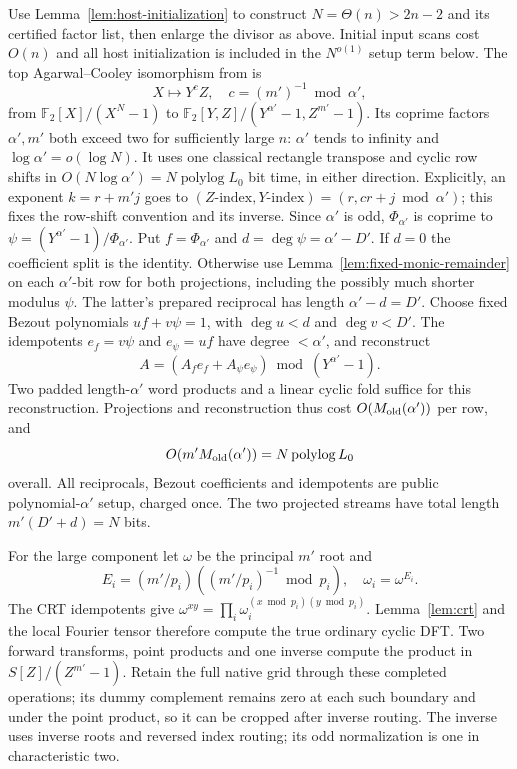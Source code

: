 \documentclass[11pt]{article}
\newcommand{\F}{\mathbb F}
\newcommand{\polylog}{\operatorname{polylog}}
\begin{document}
Use Lemma~\ref{lem:host-initialization} to construct
$N=\Theta(n)>2n-2$ and its certified factor list, then enlarge the
divisor as above. Initial input scans cost $O(n)$ and all host
initialization is included in the $N^{o(1)}$ setup term below.
The top Agarwal--Cooley isomorphism from \cite[Lemma 2.2]{cyclomult} is
\[
 X\longmapsto Y^cZ,\quad c=(m')^{-1}\bmod\alpha',
\]
from $\F_2[X]/(X^N-1)$ to
$\F_2[Y,Z]/(Y^{\alpha'}-1,Z^{m'}-1)$.
Its coprime factors $\alpha',m'$ both exceed two for sufficiently large
$n$: $\alpha'$ tends to infinity and $\log\alpha'=o(\log N)$.
It uses one classical rectangle transpose and cyclic row shifts in
$O(N\log\alpha')=N\polylog L_0$ bit time, in either direction.
Explicitly, an exponent $k=r+m'j$ goes to
$(Z\text{-index},Y\text{-index})=(r,cr+j\bmod\alpha')$;
this fixes the row-shift convention and its inverse.
Since $\alpha'$ is odd, $\Phi_{\alpha'}$ is coprime to
$\psi=(Y^{\alpha'}-1)/\Phi_{\alpha'}$.
Put $f=\Phi_{\alpha'}$ and $d=\deg\psi=\alpha'-D'$.
If $d=0$ the coefficient split is the identity. Otherwise use
Lemma~\ref{lem:fixed-monic-remainder} on each $\alpha'$-bit row
for both projections, including the possibly much shorter modulus
$\psi$. The latter's prepared reciprocal has length $\alpha'-d=D'$.
Choose fixed Bezout polynomials $uf+v\psi=1$, with
$\deg u<d$ and $\deg v<D'$. The idempotents
$e_f=v\psi$ and $e_\psi=uf$ have degree $<\alpha'$, and reconstruct
\[
 A=(A_f e_f+A_\psi e_\psi)\bmod(Y^{\alpha'}-1).
\]
Two padded length-$\alpha'$ word products and a linear cyclic fold
suffice for this reconstruction. Projections and reconstruction thus
  cost $O(M_{\rm old}(\alpha'))$ per row, and
  \[
    O(m'M_{\rm old}(\alpha'))=N\polylog L_0
  \]
  overall. All reciprocals,
Bezout coefficients and idempotents are public polynomial-$\alpha'$
setup, charged once. The two projected streams have total length
$m'(D'+d)=N$ bits.

For the large component let $\omega$ be the principal $m'$ root and
\[
 E_i=(m'/p_i)((m'/p_i)^{-1}\bmod p_i),\quad \omega_i=\omega^{E_i}.
\]
The CRT idempotents give
$\omega^{xy}=\prod_i\omega_i^{(x\bmod p_i)(y\bmod p_i)}$.
Lemma~\ref{lem:crt} and the local Fourier tensor therefore compute
the true ordinary cyclic DFT. Two forward transforms, point products
and one inverse compute the product in $S[Z]/(Z^{m'}-1)$.
Retain the full native grid through these completed operations;
its dummy complement remains zero at each such boundary and under
the point product, so it can be cropped after inverse routing.
The inverse uses inverse roots and reversed index routing; its odd
normalization is one in characteristic two.
\end{document}
